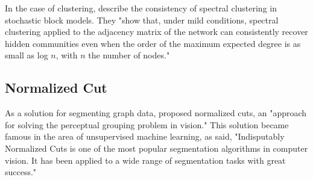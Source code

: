 In the case of clustering, \textcite[]{Lei2013} describe the consistency of spectral clustering in stochastic block models. They "show that, under mild conditions, spectral clustering applied to the adjacency matrix of the network can consistently recover hidden communities even when the order of the maximum expected degree is as small as log $n$, with $n$ the number of nodes." \autocite[1]{Lei2013}


\subsection{Normalized Cut}

As a solution for segmenting graph data, \textcite[]{Shi2000} proposed normalized cuts, an "approach for solving the perceptual grouping problem in vision." \autocite[1]{Shi2000} This solution became famous in the area of unsupervised machine learning, as \textcite[]{Eriksson2011} said, "Indisputably Normalized Cuts is one of the most popular segmentation algorithms in computer vision. It has been applied to a wide range of segmentation tasks with great success." \autocite[1]{Eriksson2011}
